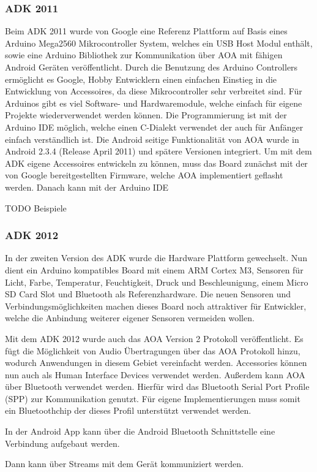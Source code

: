 \documentclass[12pt,journal,compsoc]{IEEEtran}
\begin{document}
\subsubsection{ADK 2011}
Beim ADK 2011 wurde von Google eine
Referenz Plattform auf Basis eines Arduino Mega2560 Mikrocontroller System, welches ein USB Host Modul enthält, sowie eine Arduino Bibliothek zur Kommunikation über AOA mit fähigen Android Geräten veröffentlicht.
Durch die Benutzung des Arduino Controllers ermöglicht es Google, Hobby Entwicklern einen einfachen Einstieg in die Entwicklung von Accessoires, da diese Mikrocontroller sehr verbreitet sind.
Für Arduinos gibt es viel Software- und Hardwaremodule, welche einfach für eigene Projekte wiederverwendet werden können.
Die Programmierung ist mit der Arduino IDE möglich, welche einen C-Dialekt verwendet der auch für Anfänger einfach verständlich ist.
Die Android seitige Funktionalität von AOA wurde in Android 2.3.4 (Release April 2011) und spätere Versionen integriert. 
Um mit dem ADK eigene Accessoires entwickeln zu können, muss das Board zunächst mit der von Google bereitgestellten Firmware, welche AOA implementiert geflasht werden.
Danach kann mit der Arduino IDE 


TODO Beispiele
\subsubsection{ADK 2012}
In der zweiten Version des ADK wurde die Hardware Plattform gewechselt. Nun dient ein Arduino kompatibles Board mit einem ARM Cortex M3, Sensoren für Licht, Farbe, Temperatur, Feuchtigkeit, Druck und Beschleunigung, einem Micro SD Card Slot und Bluetooth als Referenzhardware.
Die neuen Sensoren und Verbindungsmöglichkeiten machen dieses Board noch attraktiver für Entwickler, welche die Anbindung weiterer eigener Sensoren vermeiden wollen.

Mit dem ADK 2012 wurde auch das AOA Version 2 Protokoll veröffentlicht.
Es fügt die Möglichkeit von Audio Übertragungen über das AOA Protokoll hinzu, wodurch Anwendungen in diesem Gebiet vereinfacht werden.
Accessories können nun auch als Human Interface Devices verwendet werden.
Außerdem kann AOA über Bluetooth verwendet werden. Hierfür wird das Bluetooth Serial Port Profile (SPP) zur Kommunikation genutzt. Für eigene Implementierungen muss somit ein Bluetoothchip der dieses Profil unterstützt verwendet werden.


In der Android App kann über die Android Bluetooth Schnittstelle eine Verbindung aufgebaut werden.

Dann kann über Streams mit dem Gerät kommuniziert werden.
\end{document}
